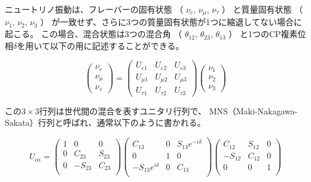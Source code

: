 ニュートリノ振動は、フレーバーの固有状態
（
$\nu_{e}$,
$\nu_{\mu}$,
$\nu_{\tau}$
）
と質量固有状態
（
$\nu_{1}$,
$\nu_{2}$,
$\nu_{3}$
）
が一致せず、さらに3つの質量固有状態が1つに縮退してない場合に起こる。
この場合、混合状態は3つの混合角
（
$\theta_{12}$,
$\theta_{23}$,
$\theta_{13}$
）
と1つのCP複素位相$\delta$を用いて以下の用に記述することができる。


\begin{equation}
    \begin{pmatrix}
        \nu_{e}\\
        \nu_{\mu}\\
        \nu_{\tau}
    \end{pmatrix}
    =
    \begin{pmatrix}
        U_{e1} & U_{e2} & U_{e3}\\
        U_{\mu1} & U_{\mu2} & U_{\mu3}\\
        U_{\tau1} & U_{\tau2} & U_{\tau3}
    \end{pmatrix}
    \begin{pmatrix}
        \nu_{1}\\
        \nu_{2}\\
        \nu_{3}
    \end{pmatrix}
\end{equation}


この$3 \times 3$行列は世代間の混合を表すユニタリ行列で、
MNS（Maki-Nakagawa-Sakata）行列と呼ばれ\cite{mns}、通常以下のように書かれる。

\begin{equation}
    U_{\alpha i} =
    \begin{pmatrix}
        1 & 0 & 0 \\
        0 & C_{23} & S_{23} \\
        0 & -S_{23} & C_{23} \\
    \end{pmatrix}
    \begin{pmatrix}
        C_{13} & 0 & S_{13}e^{-i\delta} \\
        0 & 1 & 0 \\
        -S_{13}e^{i\delta} & 0 & C_{13} \\
    \end{pmatrix}
    \begin{pmatrix}
        C_{12} & S_{12} & 0 \\
        -S_{12} & C_{12} & 0 \\
        0 & 0 & 1 \\
    \end{pmatrix}
\end{equation}

